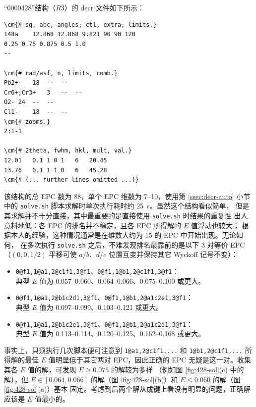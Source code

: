 “0000428”结构（$R\bar3$）的 decr 文件如下所示：
\begin{Verbatim}
\cm{# sg, abc, angles; ctl, extra; limits.}
148a	12.868 12.868 9.821	90 90 120
0.25 0.75 0.875	0.5 1.0
--

\cm{# rad/asf, n, limits, comb.}
Pb2+	18	--	--
Cr6+;Cr3+	3	--	--
O2-	24	--	--
Cl1-	18	--	--
\cm{# zooms.}
2:1-1

\cm{# 2theta, fwhm, hkl, mult, val.}
12.01	0.1	1 0 1	6	20.45
13.76	0.1	1 1 0	6	45.28
\cm{# (... further lines omitted ...)}
\end{Verbatim}
该结构的总 EPC 数为 88，单个 EPC 维数为 7--10，使用第 \ref{ssec:decr-auto} 小节
中的 \verb|solve.sh| 脚本求解时单次执行耗时约 \SI{25}{s}。虽然这个结构看似简单，
但是其求解并不十分直接，其中最重要的是直接使用 \verb|solve.sh| 时结果的重复性
出人意料地低：各 EPC 的排名并不稳定，且各 EPC 所得解的 $E$ 值浮动也较大；
根据本人的经验，这种情况通常是在维数大约为 15 的 EPC 中开始出现。无论如何，
在多次执行 \verb|solve.sh| 之后，不难发现排名最靠前的是以下 3 对等价 EPC%
（$(0, 0, 1/2)$ 平移可使 $a/b$、$d/e$ 位置互变并保持其它 Wyckoff 记号不变）：
\begin{itemize}
\item \verb|0@f1,1@a1,2@c1f1,3@f1|、\verb|0@f1,1@b1,2@c1f1,3@f1|：\\
	典型 $E$ 值为 0.057--0.060、0.064--0.066、0.075--0.100 或更大。
\item \verb|0@f1,1@a1,2@b1c2d1,3@f1|、\verb|0@f1,1@b1,2@a1c2e1,3@f1|：\\
	典型 $E$ 值为 0.097--0.099、0.103--0.121 或更大。
\item \verb|0@f1,1@a1,2@b1c2e1,3@f1|、\verb|0@f1,1@b1,2@a1c2d1,3@f1|：\\
	典型 $E$ 值为 0.113--0.114、0.120--0.125、0.162--0.168 或更大。
\end{itemize}
事实上，只须执行几次脚本便可注意到 \verb|1@a1,2@c1f1,...| 和
\verb|1@b1,2@c1f1,...| 所得解的最佳 $E$ 值明显低于其它两对 EPC，因此正确的
EPC 无疑是这一对。收集其各 $E$ 值的解，可发现 $E \geq 0.075$ 的解较为多样
（例如图 \ref{fig:428-sol}(c) 中的解），但 $E \in [0.064, 0.066]$ 的解（图
\ref{fig:428-sol}(b)）和 $E \leq 0.060$ 的解（图 \ref{fig:428-sol}(a)）基本
固定。考虑到后两个解从成键上看没有明显的问题，正确解应该是 $E$ 值最小的。

